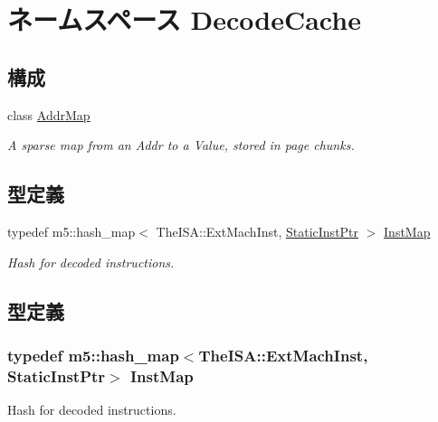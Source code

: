 \hypertarget{namespaceDecodeCache}{
\section{ネームスペース DecodeCache}
\label{namespaceDecodeCache}
}
\subsection*{構成}
\begin{DoxyCompactItemize}
\item 
class \hyperlink{classDecodeCache_1_1AddrMap}{AddrMap}
\begin{DoxyCompactList}\small\item\em A sparse map from an Addr to a Value, stored in page chunks. \item\end{DoxyCompactList}\end{DoxyCompactItemize}
\subsection*{型定義}
\begin{DoxyCompactItemize}
\item 
typedef m5::hash\_\-map$<$ TheISA::ExtMachInst, \hyperlink{classRefCountingPtr}{StaticInstPtr} $>$ \hyperlink{namespaceDecodeCache_ac4aa7140c72815d25936c8dcf04191f1}{InstMap}
\begin{DoxyCompactList}\small\item\em Hash for decoded instructions. \item\end{DoxyCompactList}\end{DoxyCompactItemize}


\subsection{型定義}
\hypertarget{namespaceDecodeCache_ac4aa7140c72815d25936c8dcf04191f1}{
\subsubsection[{InstMap}]{\setlength{\rightskip}{0pt plus 5cm}typedef m5::hash\_\-map$<$TheISA::ExtMachInst, {\bf StaticInstPtr}$>$ {\bf InstMap}}}
\label{namespaceDecodeCache_ac4aa7140c72815d25936c8dcf04191f1}


Hash for decoded instructions. 